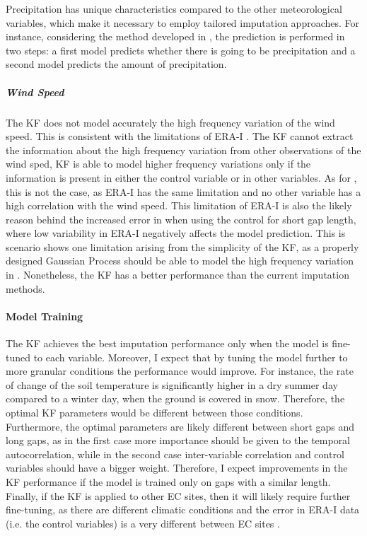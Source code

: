 \documentclass{article}
\begin{document}
Precipitation has unique characteristics compared to the other meteorological variables, which make it necessary to employ tailored imputation approaches. For instance, considering the method developed in \textcite{chivers_imputation_2020}, the prediction is performed in two steps: a first model predicts whether there is going to be precipitation and a second model predicts the amount of precipitation.

\subparagraph{Wind Speed} The KF does not model accurately the high frequency variation of the wind speed. This is consistent with the limitations of ERA-I \cite{vuichard_filling_2015}. The KF cannot extract the information about the high frequency variation from other observations of the wind sped, KF is able to model higher frequency variations only if the information is present in either the control variable or in other variables. As for , this is not the case, as ERA-I has the same limitation and no other variable has a high correlation with the wind speed. This limitation of ERA-I is also the likely reason behind the increased error in  when using the control for short gap length, where low variability in ERA-I negatively affects the model prediction.
This is scenario shows one limitation arising from the simplicity of the KF, as a properly designed Gaussian Process should be able to model the high frequency variation in . Nonetheless, the KF has a better performance than the current imputation methods.

\paragraph{Model Training} The KF achieves the best imputation performance only when the model is fine-tuned to each variable.
Moreover, I expect that by tuning the model further to more granular conditions the performance would improve.
For instance, the rate of change of the soil temperature is significantly  higher in a dry summer day compared to a winter day, when the ground is covered in snow. Therefore, the optimal KF parameters would be different between those conditions.
Furthermore, the optimal parameters are likely different between short gaps and long gaps, as in the first case more importance should be given to the temporal autocorrelation, while in the second case inter-variable correlation and control variables should have a bigger weight. Therefore, I expect improvements in the KF performance if the model is trained only on gaps with a similar length.
Finally, if the KF is applied to other EC sites, then it will likely require further fine-tuning, as there are different climatic conditions and the error in ERA-I data (i.e. the control variables) is a very different between EC sites \cite{vuichard_filling_2015}.
\end{document}
